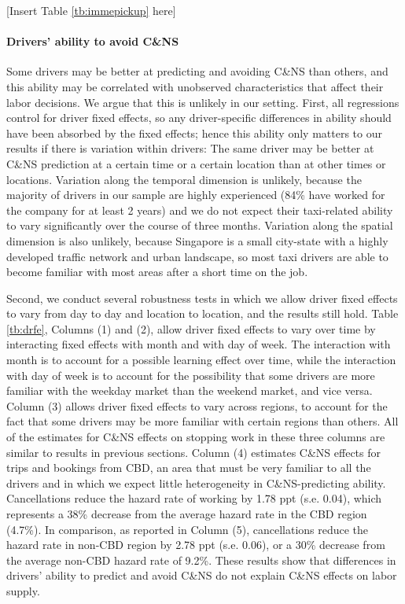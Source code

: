 \documentclass[reviewmode]{restat}
\begin{document}
\begin{center}
    [Insert Table \ref{tb:immepickup} here]
\end{center}

\paragraph{Drivers' ability to avoid C\&NS} Some drivers may be better at predicting and avoiding C\&NS 
than others, and this ability may be correlated with unobserved characteristics that affect their labor 
decisions. We argue that this is unlikely in our setting. First, all regressions control for driver fixed
effects, so any driver-specific differences in ability should have been absorbed by the fixed effects;
hence this ability only matters to our results if there is variation within drivers: The same driver may 
be better at C\&NS prediction at a certain time or a certain location than at other times or locations. 
Variation along the temporal dimension is unlikely, because the majority of drivers in our sample are highly
experienced (84\% have worked for the company for at least 2 years) and we do not expect their taxi-related
ability to vary significantly over the course of three months. Variation along the spatial dimension is also
unlikely, because Singapore is a small city-state with a highly developed traffic network and urban landscape,
so most taxi drivers are able to become familiar with most areas after a short time on the job. 

Second, we conduct several robustness tests in which we allow driver fixed effects to vary from day to day 
and location to location, and the results still hold. Table  \ref{tb:drfe}, Columns (1) and (2), allow driver
fixed effects to vary over time by interacting fixed effects with month and with day of week. The interaction
with month is to account for a possible learning effect over time, while the interaction with day of week is
to account for the possibility that some drivers are more familiar with the weekday market than the weekend
market, and vice versa. Column (3) allows driver fixed effects to vary across regions, to account for the fact 
that some drivers may be more familiar with certain regions than others. All of the estimates for C\&NS effects
on stopping work in these three columns are %
similar to results in previous sections. Column (4) estimates C\&NS effects for trips and bookings from CBD, 
an area that must be very familiar to all the drivers and in which we expect little heterogeneity in
C\&NS-predicting ability. Cancellations reduce the hazard rate of working by 1.78 ppt (s.e. 0.04), which 
represents a 38\% decrease from the average hazard rate in the CBD region (4.7\%). In comparison, as
reported in Column (5), cancellations reduce the hazard rate in non-CBD region by 2.78 ppt (s.e. 0.06), 
or a 30\% decrease from the average non-CBD hazard rate of 9.2\%. These results show that differences in
drivers' ability to predict and avoid C\&NS do not explain C\&NS effects on labor supply.
\end{document}
